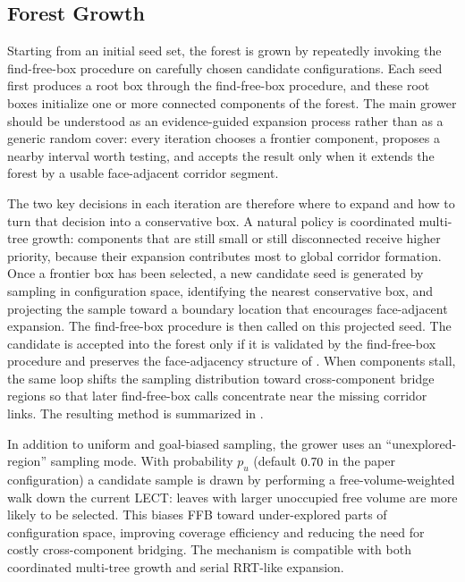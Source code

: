 \documentclass[journal]{IEEEtran}
\begin{document}
\subsection{Forest Growth}\label{sec:forest_growth}

Starting from an initial seed set, the forest is grown by repeatedly invoking
the find-free-box procedure on carefully chosen candidate configurations.
Each seed first produces a root box through the find-free-box procedure, and
these root boxes initialize one or more connected components of the forest.
The main grower should be understood as an
evidence-guided expansion process rather than as a generic random cover:
every iteration chooses a frontier component, proposes a nearby interval worth
testing, and accepts the result only when it extends the forest by a usable
face-adjacent corridor segment.

The two key decisions in each iteration are therefore where to expand and how
to turn that decision into a conservative box. A natural policy is coordinated
multi-tree growth: components that are still small or still disconnected
receive higher priority, because their expansion contributes most to global
corridor formation. Once a frontier box has been selected, a new candidate seed
is generated by sampling in configuration space, identifying the nearest
conservative box, and projecting the sample toward a boundary location that
  encourages face-adjacent expansion. The find-free-box procedure is then called on this projected seed.
  The candidate is accepted into the forest only if it is validated by the
  find-free-box procedure and preserves the face-adjacency structure of
  . When
components stall, the same loop shifts the sampling distribution toward
  cross-component bridge regions so that later find-free-box calls concentrate near the
missing corridor links. The resulting method is summarized in
.

In addition to uniform and goal-biased sampling, the grower uses an
``unexplored-region'' sampling mode. With probability $p_u$ (default
$0.70$ in the paper configuration) a candidate sample is drawn by
performing a free-volume-weighted walk down the current LECT: leaves with
larger unoccupied free volume are more likely to be selected. This biases FFB
toward under-explored parts of configuration space, improving coverage
efficiency and reducing the need for costly cross-component bridging. The
mechanism is compatible with both coordinated multi-tree growth and serial
RRT-like expansion.
\end{document}

